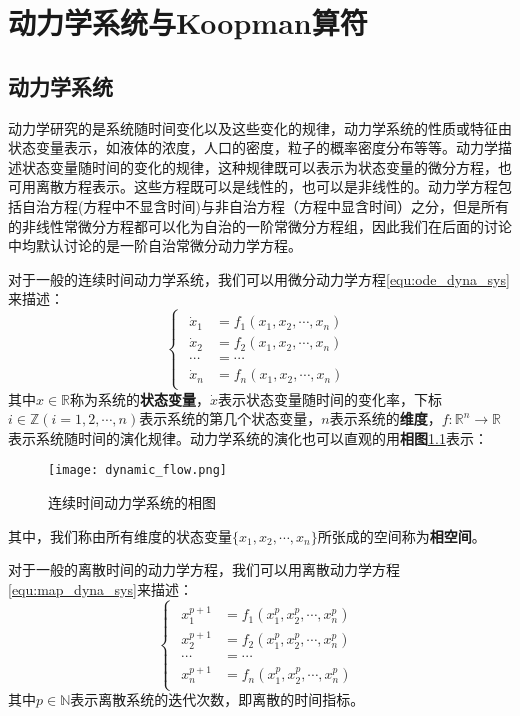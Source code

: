 \chapter{动力学系统与Koopman算符}

\section{动力学系统}
动力学研究的是系统随时间变化以及这些变化的规律，动力学系统的性质或特征由状态变量表示，如液体的浓度，人口的密度，粒子的概率密度分布等等。动力学描述状态变量随时间的变化的规律，这种规律既可以表示为状态变量的微分方程，也可用离散方程表示。这些方程既可以是线性的，也可以是非线性的。动力学方程包括自治方程(方程中不显含时间)与非自治方程（方程中显含时间）之分，但是所有的非线性常微分方程都可以化为自治的一阶常微分方程组，因此我们在后面的讨论中均默认讨论的是一阶自治常微分动力学方程。

对于一般的连续时间动力学系统，我们可以用微分动力学方程\eqref{equ:ode_dyna_sys}来描述：
\begin{equation}
    \begin{cases}
        \begin{aligned}
            \dot{x}_1 &= f_1(x_1,x_2,\cdots,x_n)\\
            \dot{x}_2 &= f_2(x_1,x_2,\cdots,x_n)\\
            \cdots &= \cdots \\
            \dot{x}_n &= f_n(x_1,x_2,\cdots,x_n)
        \end{aligned}
    \end{cases}\label{equ:ode_dyna_sys}
\end{equation}
其中$x\in \mathbb{R}$称为系统的\textbf{状态变量}，$\dot{x}$表示状态变量随时间的变化率，下标$i\in \mathbb{Z}(i=1,2,\cdots,n)$表示系统的第几个状态变量，$n$表示系统的\textbf{维度}，$f:\mathbb{R}^n\rightarrow\mathbb{R}$表示系统随时间的演化规律。动力学系统的演化也可以直观的用\textbf{相图}\ref{fig:pha_spa}表示：
\begin{figure}
	\centering
	\texttt{[image: dynamic\_flow.png]}
    \caption{连续时间动力学系统的相图}
    \label{fig:pha_spa}
\end{figure}
其中，我们称由所有维度的状态变量$\{x_1,x_2,\cdots,x_n\}$所张成的空间称为\textbf{相空间}。

对于一般的离散时间的动力学方程，我们可以用离散动力学方程\eqref{equ:map_dyna_sys}来描述：
\begin{equation}
    \begin{cases}
        \begin{aligned}
            x_1^{p+1} &= f_1(x_1^p,x_2^p,\cdots,x_n^p)\\
            x_2^{p+1} &= f_2(x_1^p,x_2^p,\cdots,x_n^p)\\
            \cdots &= \cdots \\
            x_n^{p+1} &= f_n(x_1^p,x_2^p,\cdots,x_n^p)
        \end{aligned}
    \end{cases}\label{equ:map_dyna_sys}
\end{equation}
其中$p\in \mathbb{N}$表示离散系统的迭代次数，即离散的时间指标。

